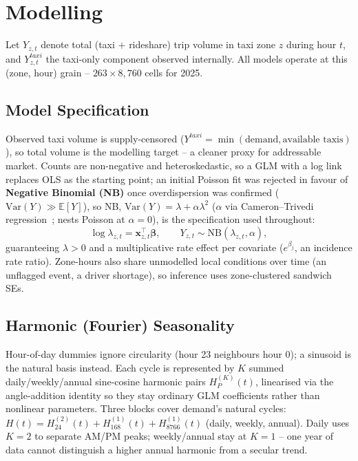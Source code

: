 \documentclass[11pt]{article}
\begin{document}
\FloatBarrier
\section{Modelling}
\label{sec:modelling}

Let $Y_{z,t}$ denote total (taxi $+$ rideshare) trip volume in taxi zone $z$ during hour $t$, and $Y^{taxi}_{z,t}$ the taxi-only component observed internally. All models operate at this (zone, hour) grain -- $263 \times 8{,}760$ cells for 2025.

\subsection{Model Specification}

Observed taxi volume is supply-censored ($Y^{taxi} = \min(\text{demand}, \text{available taxis})$), so total volume is the modelling target -- a cleaner proxy for addressable market. Counts are non-negative and heteroskedastic, so a GLM with a log link replaces OLS as the starting point; an initial Poisson fit was rejected in favour of \textbf{Negative Binomial (NB)} once overdispersion was confirmed ($\text{Var}(Y) \gg \mathbb{E}[Y]$), so NB, $\text{Var}(Y) = \lambda + \alpha\lambda^2$ ($\alpha$ via Cameron--Trivedi regression~\cite{cameron_trivedi_count}; nests Poisson at $\alpha=0$), is the specification used throughout:
\begin{equation}
    \log \lambda_{z,t} = \mathbf{x}_{z,t}^\top \boldsymbol\beta, \qquad Y_{z,t} \sim \text{NB}(\lambda_{z,t}, \alpha),
\end{equation}
guaranteeing $\lambda > 0$ and a multiplicative rate effect per covariate ($e^{\beta_j}$, an incidence rate ratio). Zone-hours also share unmodelled local conditions over time (an unflagged event, a driver shortage), so inference uses zone-clustered sandwich SEs.

\subsection{Harmonic (Fourier) Seasonality}
\label{sec:harmonics}

Hour-of-day dummies ignore circularity (hour 23 neighbours hour 0); a sinusoid is the natural basis instead. Each cycle is represented by $K$ summed daily/weekly/annual sine-cosine harmonic pairs $H_P^{(K)}(t)$, linearised via the angle-addition identity so they stay ordinary GLM coefficients rather than nonlinear parameters. Three blocks cover demand's natural cycles: $H(t) = H_{24}^{(2)}(t) + H_{168}^{(1)}(t) + H_{8766}^{(1)}(t)$ (daily, weekly, annual). Daily uses $K{=}2$ to separate AM/PM peaks; weekly/annual stay at $K{=}1$ -- one year of data cannot distinguish a higher annual harmonic from a secular trend.
\end{document}
